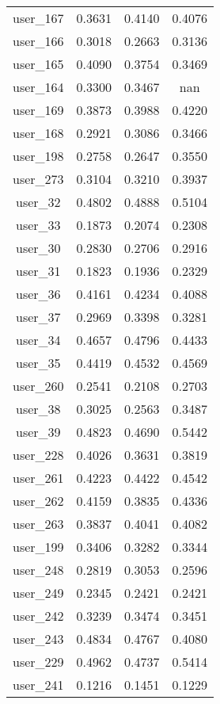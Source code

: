 \begin{table}[ht]
\begin{tabular}{|c|c|c|c|}
user_167  &  0.3631   &  0.4140   &  0.4076 \\ 
user_166  &  0.3018   &  0.2663   &  0.3136 \\ 
user_165  &  0.4090   &  0.3754   &  0.3469 \\ 
user_164  &  0.3300   &  0.3467   &  nan \\ 
user_169  &  0.3873   &  0.3988   &  0.4220 \\ 
user_168  &  0.2921   &  0.3086   &  0.3466 \\ 
user_198  &  0.2758   &  0.2647   &  0.3550 \\ 
user_273  &  0.3104   &  0.3210   &  0.3937 \\ 
user_32  &  0.4802   &  0.4888   &  0.5104 \\ 
user_33  &  0.1873   &  0.2074   &  0.2308 \\ 
user_30  &  0.2830   &  0.2706   &  0.2916 \\ 
user_31  &  0.1823   &  0.1936   &  0.2329 \\ 
user_36  &  0.4161   &  0.4234   &  0.4088 \\ 
user_37  &  0.2969   &  0.3398   &  0.3281 \\ 
user_34  &  0.4657   &  0.4796   &  0.4433 \\ 
user_35  &  0.4419   &  0.4532   &  0.4569 \\ 
user_260  &  0.2541   &  0.2108   &  0.2703 \\ 
user_38  &  0.3025   &  0.2563   &  0.3487 \\ 
user_39  &  0.4823   &  0.4690   &  0.5442 \\ 
user_228  &  0.4026   &  0.3631   &  0.3819 \\ 
user_261  &  0.4223   &  0.4422   &  0.4542 \\ 
user_262  &  0.4159   &  0.3835   &  0.4336 \\ 
user_263  &  0.3837   &  0.4041   &  0.4082 \\ 
user_199  &  0.3406   &  0.3282   &  0.3344 \\ 
user_248  &  0.2819   &  0.3053   &  0.2596 \\ 
user_249  &  0.2345   &  0.2421   &  0.2421 \\ 
user_242  &  0.3239   &  0.3474   &  0.3451 \\ 
user_243  &  0.4834   &  0.4767   &  0.4080 \\ 
user_229  &  0.4962   &  0.4737   &  0.5414 \\ 
user_241  &  0.1216   &  0.1451   &  0.1229 \\ 

\end{tabular}
\end{table}
